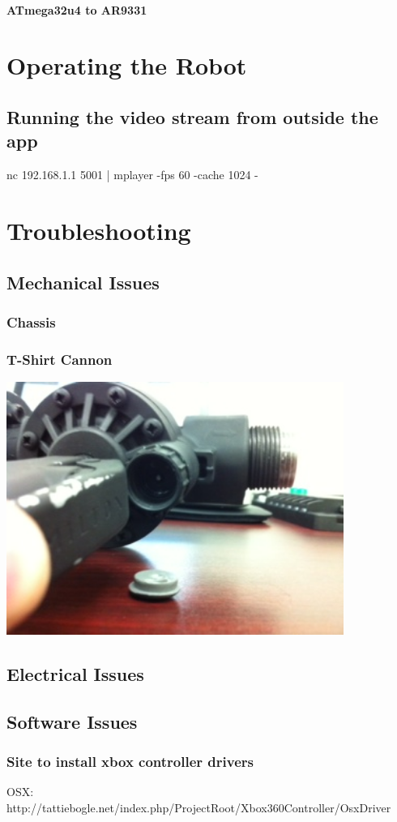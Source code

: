 \documentclass[letterpaper,12pt]{article}
\begin{document}
\paragraph{ATmega32u4 to AR9331}
\label{sec:mega_ath_msg}

\section{Operating the Robot}

\subsection{Running the video stream from outside the app}
nc 192.168.1.1 5001 | mplayer -fps 60 -cache 1024 -

\section{Troubleshooting}

\subsection{Mechanical Issues}
\subsubsection{Chassis}
\subsubsection{T-Shirt Cannon}

\begin{center}
    \includegraphics[width=11cm]{pics/cannon/broken_release_valve.jpg}
\end{center}

\subsection{Electrical Issues}

\subsection{Software Issues}
\subsubsection{Site to install xbox controller drivers}
OSX: http://tattiebogle.net/index.php/ProjectRoot/Xbox360Controller/OsxDriver
\end{document}
